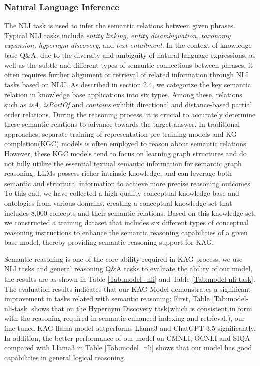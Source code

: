 \documentclass{article}
\begin{document}
\subsubsection{Natural Language Inference}

The NLI task is used to infer the semantic relations between given phrases. Typical NLI tasks include \textit{entity linking, entity disambiguation, taxonomy expansion, hypernym discovery}, and \textit{text entailment}. In the context of knowledge base Q\&A, due to the diversity and ambiguity of natural language expressions, as well as the subtle and different types of semantic connections between phrases, it often requires further alignment or retrieval of related information through NLI tasks based on NLU.
As described in section 2.4, we categorize the key semantic relation in knowledge base applications into six types. Among these, relations such as \textit{isA, isPartOf} and \textit{contains} exhibit directional and distance-based partial order relations. During the reasoning process, it is crucial to accurately determine these semantic relations to advance towards the target answer. In traditional approaches, separate training of representation pre-training models and KG completion(KGC) models is often employed to reason about semantic relations. However, these KGC models tend to focus on learning graph structures and do not fully utilize the essential textual semantic information for semantic graph reasoning. LLMs possess richer intrinsic knowledge, and can leverage both semantic and structural information to achieve more precise reasoning outcomes. To this end, we have collected a high-quality conceptual knowledge base and ontologies from various domains, creating a conceptual knowledge set that includes 8,000 concepts and their semantic relations. Based on this knowledge set, we constructed a training dataset that includes six different types of conceptual reasoning instructions to enhance the semantic reasoning capabilities of a given base model, thereby providing semantic reasoning support for KAG.

Semantic reasoning is one of the core ability required in KAG process, we use NLI tasks and general reasoning Q\&A tasks to evaluate the ability of our model, the results are as shown in Table \ref{Tab.model_nli} and Table \ref{Tab:model-nli-task}. The evaluation results indicates that our KAG-Model demonstrates a significant improvement in tasks related with semantic reasoning: First, Table \ref{Tab:model-nli-task} shows that on the Hypernym Discovery task(which is consistent in form with the reasoning required in semantic enhanced indexing and retrieval.), our fine-tuned KAG-llama model outperforms Llama3 and ChatGPT-3.5 significantly. In addition, the better performance of our model on CMNLI, OCNLI and SIQA compared with Llama3 in Table \ref{Tab.model_nli} shows that our model has good capabilities in general logical reasoning. 
\end{document}
